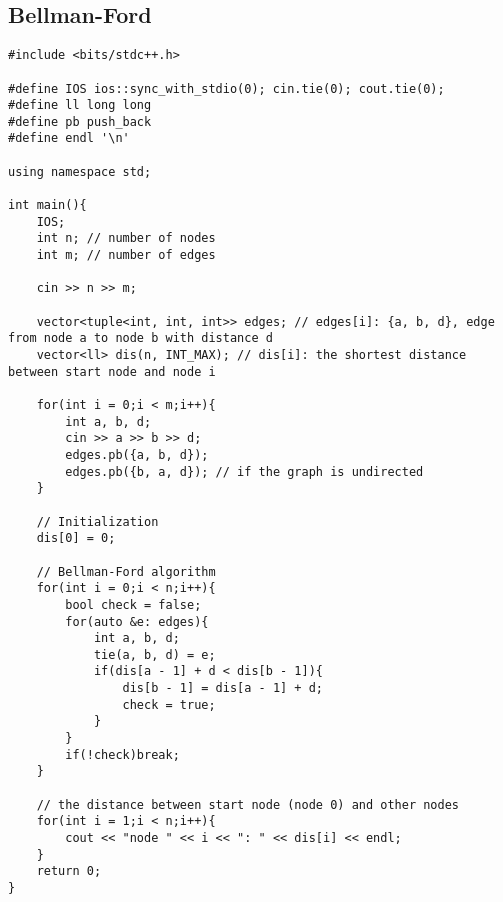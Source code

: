 \documentclass[12pt, a4paper]{article}
\begin{document}
\subsection{Bellman-Ford}
\begin{lstlisting}
#include <bits/stdc++.h>

#define IOS ios::sync_with_stdio(0); cin.tie(0); cout.tie(0);
#define ll long long
#define pb push_back
#define endl '\n'

using namespace std;

int main(){
    IOS;
    int n; // number of nodes
    int m; // number of edges

    cin >> n >> m;

    vector<tuple<int, int, int>> edges; // edges[i]: {a, b, d}, edge from node a to node b with distance d
    vector<ll> dis(n, INT_MAX); // dis[i]: the shortest distance between start node and node i

    for(int i = 0;i < m;i++){
        int a, b, d;
        cin >> a >> b >> d;
        edges.pb({a, b, d});
        edges.pb({b, a, d}); // if the graph is undirected
    }

    // Initialization
    dis[0] = 0;

    // Bellman-Ford algorithm
    for(int i = 0;i < n;i++){
        bool check = false;
        for(auto &e: edges){
            int a, b, d;
            tie(a, b, d) = e;
            if(dis[a - 1] + d < dis[b - 1]){
                dis[b - 1] = dis[a - 1] + d;
                check = true;
            }
        }
        if(!check)break;
    }

    // the distance between start node (node 0) and other nodes
    for(int i = 1;i < n;i++){
        cout << "node " << i << ": " << dis[i] << endl;
    }
    return 0;
}
\end{lstlisting}
\end{document}
